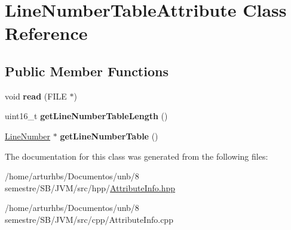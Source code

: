 \hypertarget{classLineNumberTableAttribute}{}\section{Line\+Number\+Table\+Attribute Class Reference}
\label{classLineNumberTableAttribute}
\subsection*{Public Member Functions}
\begin{DoxyCompactItemize}
\item 
void {\bfseries read} (F\+I\+LE $\ast$)\hypertarget{classLineNumberTableAttribute_ac9f04f51b04043960f7bdde688ac3b76}{}\label{classLineNumberTableAttribute_ac9f04f51b04043960f7bdde688ac3b76}

\item 
uint16\+\_\+t {\bfseries get\+Line\+Number\+Table\+Length} ()\hypertarget{classLineNumberTableAttribute_affc65d74e03649b1109d106517c831e6}{}\label{classLineNumberTableAttribute_affc65d74e03649b1109d106517c831e6}

\item 
\hyperlink{classLineNumber}{Line\+Number} $\ast$ {\bfseries get\+Line\+Number\+Table} ()\hypertarget{classLineNumberTableAttribute_ac30f06bbc3b2a986c7912379215f68bb}{}\label{classLineNumberTableAttribute_ac30f06bbc3b2a986c7912379215f68bb}

\end{DoxyCompactItemize}


The documentation for this class was generated from the following files\+:\begin{DoxyCompactItemize}
\item 
/home/arturhbs/\+Documentos/unb/8 semestre/\+S\+B/\+J\+V\+M/src/hpp/\hyperlink{AttributeInfo_8hpp}{Attribute\+Info.\+hpp}\item 
/home/arturhbs/\+Documentos/unb/8 semestre/\+S\+B/\+J\+V\+M/src/cpp/Attribute\+Info.\+cpp\end{DoxyCompactItemize}
